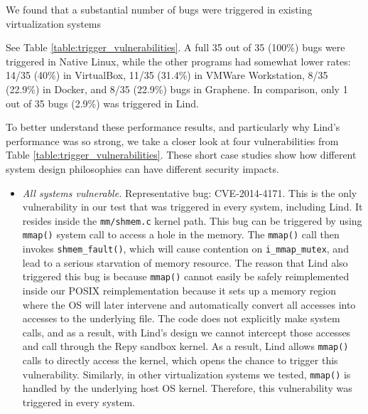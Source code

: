 We found that a substantial number of bugs were triggered in existing
virtualization systems {See Table \ref{table:trigger_vulnerabilities}.
A full 35 out of 35 (100\%) bugs were triggered in Native Linux,
while the other programs had somewhat lower rates: 14/35 (40\%) in
VirtualBox,
11/35 (31.4\%)  in VMWare Workstation, 8/35 (22.9\%)  in Docker, and 8/35
(22.9\%) bugs in Graphene.
In comparison, only 1 out of 35 bugs  (2.9\%) was triggered in Lind.

To better understand these performance results, and particularly why Lind's
performance was so strong, we take a closer look at four
vulnerabilities from Table \ref{table:trigger_vulnerabilities}. These short case
studies show how different system design philosophies can have
 different security impacts.

\begin{itemize}

\item \emph{All systems vulnerable.}  Representative bug: CVE-2014-4171.
This is the only vulnerability in our test that was triggered in every
system, including Lind. It resides inside the \texttt{mm/shmem.c} kernel path. This bug can
be triggered by using \texttt{mmap()} system call to access a hole in the memory.
The \texttt{mmap()} call then invokes \texttt{shmem\_fault()}, which will cause contention
on \texttt{i\_mmap\_mutex}, and lead to a serious starvation of memory resource. 
The reason that Lind also triggered this bug is because \texttt{mmap()} cannot easily
be safely reimplemented inside our POSIX reimplementation because it sets up a
memory region where the OS will later
intervene and automatically convert all accesses into accesses to the
underlying file.  The code does not explicitly make system calls, and as
a result, with Lind's design we cannot intercept those accesses and call through
the Repy sandbox kernel. As a result,
Lind allows \texttt{mmap()} calls to directly access the kernel, which
opens the chance to trigger this vulnerability. Similarly, in other
virtualization systems we tested, \texttt{mmap()} is handled by the underlying
host OS kernel.  
Therefore, this vulnerability was
triggered in every system.


\end{itemize}}
